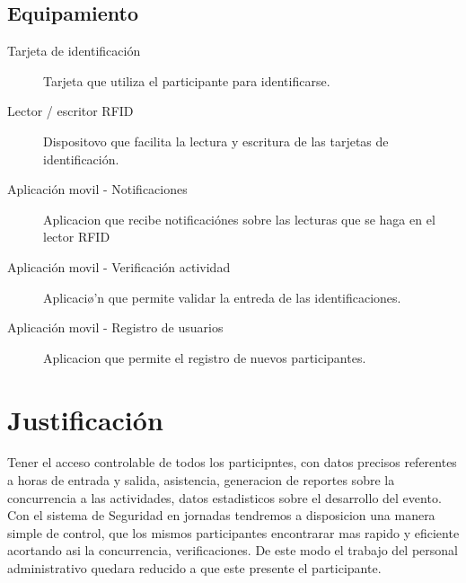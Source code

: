 \documentclass[letter,12pt]{article}
\begin{document}
	\subsection{Equipamiento}
	
	\begin{description}
		\item[Tarjeta de identificaci\'on] Tarjeta que utiliza el participante para identificarse.
		\item[Lector / escritor RFID] Dispositovo que facilita la lectura y escritura de las tarjetas de identificaci\'on.
		\item[Aplicaci\'on movil - Notificaciones] Aplicacion que recibe notificaci\'ones sobre las lecturas que se haga en el lector RFID
		\item[Aplicaci\'on movil - Verificaci\'on actividad] Aplicaci\o'n que permite validar la entreda de las identificaciones.
		\item[Aplicaci\'on movil - Registro de usuarios] Aplicacion que permite el registro de nuevos participantes.
	\end{description}		
	
\section{Justificaci\'on}

Tener el acceso controlable de todos los participntes, con datos precisos referentes a horas de entrada y salida, asistencia, generacion de reportes sobre 
la concurrencia a las actividades, datos estadisticos sobre el desarrollo del evento.\\

Con el sistema de Seguridad en jornadas tendremos a disposicion una manera simple de control, que los mismos participantes encontrarar mas rapido y eficiente acortando asi la concurrencia, verificaciones. De este modo el trabajo del personal administrativo quedara reducido a que este presente el participante.
\end{document}
